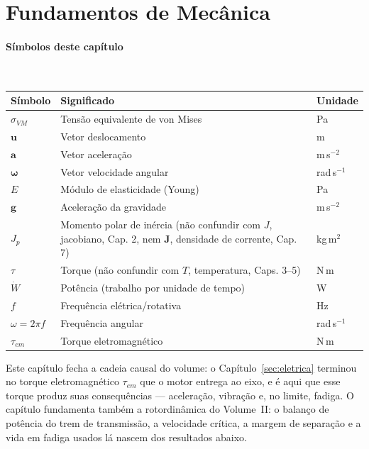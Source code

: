 \documentclass[12pt,a4paper]{article}
\numberwithin{equation}{section}
\numberwithin{table}{section}
\numberwithin{figure}{section}
\begin{document}
\section{Fundamentos de Mecânica}\label{sec:mecanica}

\paragraph{Símbolos deste capítulo}\mbox{}\\[-0.5em]
{\small
\begin{longtable}{>{\raggedright\arraybackslash}p{2.6cm} >{\raggedright\arraybackslash}p{9.2cm} >{\raggedright\arraybackslash}p{2.6cm}}
	\toprule
	\textbf{Símbolo} & \textbf{Significado} & \textbf{Unidade} \\ \midrule
	\endhead
	$\sigma_{VM}$ & Tensão equivalente de von Mises & Pa \\
	$\mathbf{u}$ & Vetor deslocamento & m \\
	$\mathbf{a}$ & Vetor aceleração & m\,s$^{-2}$ \\
	$\boldsymbol{\omega}$ & Vetor velocidade angular & rad\,s$^{-1}$ \\
	$E$ & Módulo de elasticidade (Young) & Pa \\
	$\mathbf{g}$ & Aceleração da gravidade & m\,s$^{-2}$ \\
	$J_p$ & Momento polar de inércia (não confundir com $J$, jacobiano, Cap. 2, nem $\mathbf{J}$, densidade de corrente, Cap. 7) & kg\,m$^2$ \\
	$\tau$ & Torque (não confundir com $T$, temperatura, Caps. 3--5) & N\,m \\
	$\dot{W}$ & Potência (trabalho por unidade de tempo) & W \\
	$f$ & Frequência elétrica/rotativa & Hz \\
	$\omega = 2\pi f$ & Frequência angular & rad\,s$^{-1}$ \\
	$\tau_{em}$ & Torque eletromagnético & N\,m \\
	\bottomrule
\end{longtable}
}




Este capítulo fecha a cadeia causal do volume: o Capítulo~\ref{sec:eletrica}
terminou no torque eletromagnético $\tau_{em}$ que o motor entrega ao eixo, e
é aqui que esse torque produz suas consequências --- aceleração, vibração e,
no limite, fadiga. O capítulo fundamenta também a rotordinâmica do Volume~II:
o balanço de potência do trem de transmissão, a velocidade crítica, a margem
de separação e a vida em fadiga usados lá nascem dos resultados abaixo.
\end{document}
